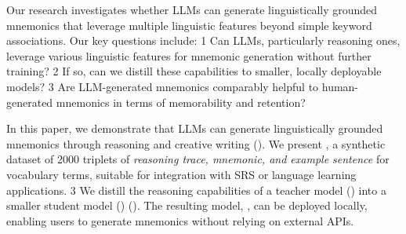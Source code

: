 Our research investigates whether LLMs can generate linguistically grounded mnemonics that leverage multiple linguistic features beyond simple keyword associations. Our key questions include: \numlist{1} Can LLMs, particularly reasoning ones, leverage various linguistic features for mnemonic generation without further training? \numlist{2} If so, can we distill these capabilities to smaller, locally deployable models? \numlist{3} Are LLM-generated mnemonics comparably helpful to human-generated mnemonics in terms of memorability and retention?

In this paper, we demonstrate that LLMs can generate linguistically grounded mnemonics through reasoning and creative writing (). We present \links, a synthetic dataset of 2000 triplets of \textit{reasoning trace, mnemonic, and example sentence} for vocabulary terms, suitable for integration with SRS or language learning applications. \numlist{3} We distill the reasoning capabilities of a teacher model (\teachermodel) into a smaller student model (\studentmodel) (). The resulting model, \linksys, can be deployed locally, enabling users to generate mnemonics without relying on external APIs.
